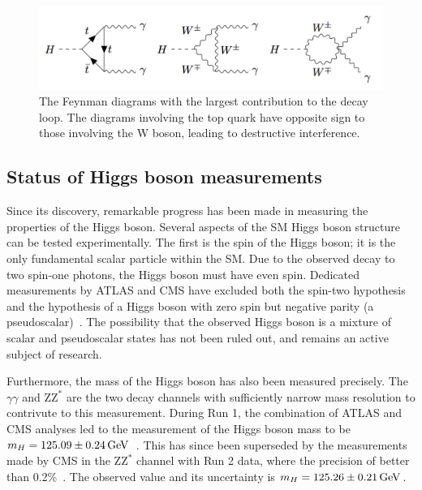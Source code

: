 \begin{figure}[hptb]
  \centering
  \includegraphics[width=\textwidth]{Figures/Theory/FeynDecay.png}
  \caption[Feyman diagrams contributing to the \Hgg decay loop.]
  {
    The Feynman diagrams with the largest contribution to the \Hgg decay loop.
    The diagrams involving the top quark have opposite sign to those involving the W boson, 
    leading to destructive interference.
  }
  \label{fig:theory_FeynDecay}
\end{figure}

\subsection{Status of Higgs boson measurements}

Since its discovery, remarkable progress has been made 
in measuring the properties of the Higgs boson.
Several aspects of the SM Higgs boson structure can be tested experimentally.
The first is the spin of the Higgs boson; it is the only fundamental scalar particle within the SM.
Due to the observed decay to two spin-one photons, the Higgs boson must have even spin.
Dedicated measurements by ATLAS and CMS have excluded both the spin-two hypothesis 
and the hypothesis of a Higgs boson with zero spin
but negative parity (a pseudoscalar)~\cite{ATLASspinHiggs,CMSspinHiggs}. %
The possibility that the observed Higgs boson is a mixture of scalar 
and pseudoscalar states has not been ruled out, and remains an active subject of research.

Furthermore, the mass of the Higgs boson has also been measured precisely. 
The $\gamma\gamma$ and $\mathrm{ZZ}^{*}$ are the two decay channels with sufficiently narrow 
mass resolution to contrivute to this measurement.
During Run 1, the combination of ATLAS and CMS analyses led to the measurement of the Higgs boson 
mass to be $m_{H} = 125.09 \pm \SI{0.24}{GeV}$~\cite{ATLASandCMSmass}.
This has since been superseded by the measurements made by CMS in the $\mathrm{ZZ}^{*}$ channel 
with Run 2 data, where the precision of better than 0.2\%~\cite{HIG-16-041}.
The observed value and its uncertainty is $m_{H} = 125.26 \pm \SI{0.21}{GeV}$.

